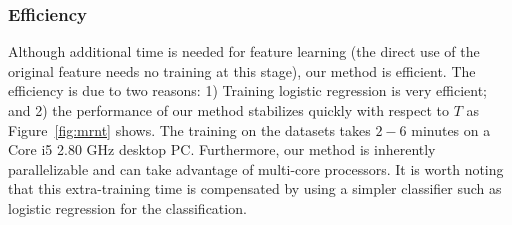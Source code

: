 \documentclass[preprint,12pt,3p]{elsarticle}
\begin{document}
 \subsubsection{Efficiency}
 Although additional time is needed for feature learning (the direct use of
 the original feature needs no training at this stage), our method is efficient. The efficiency is due to two reasons: 1) Training
 logistic regression is very efficient; and 2) the performance of our
 method stabilizes quickly with respect to $T$ as Figure~\ref{fig:mrnt}
 shows. The training on the datasets takes $2-6$ minutes on a Core i5
 2.80 GHz desktop PC. Furthermore, our method is inherently
 parallelizable and can take advantage of multi-core processors. It is
 worth noting that this extra-training time is compensated by using a
 simpler classifier such as logistic regression for the
 classification.

\end{document}
